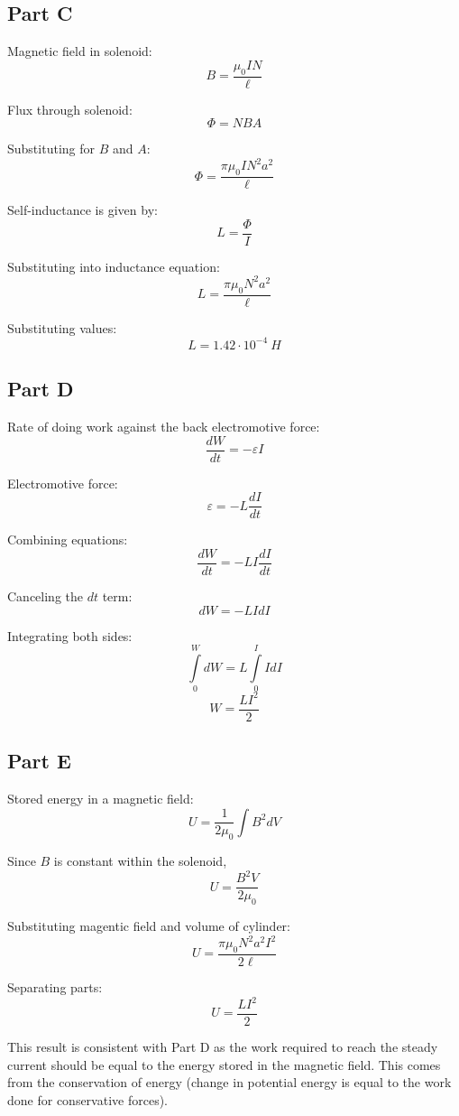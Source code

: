 \documentclass{article}
\begin{document}
\subsection*{Part C}

Magnetic field in solenoid:
$$ B = \frac{ \mu_0 I N}{\ell} $$

Flux through solenoid:
$$ \Phi = N B A $$

Substituting for $B$ and $A$:
$$ \Phi = \frac{ \pi \mu_0 I N^2 a^2}{\ell} $$

Self-inductance is given by:
$$ L = \frac{\Phi}{I} $$

Substituting into inductance equation:
$$ L = \frac{ \pi \mu_0 N^2 a^2}{\ell} $$

Substituting values:
$$ L = 1.42 \cdot 10^{-4}\ \si{H} $$

\subsection*{Part D}

Rate of doing work against the back electromotive force:
$$ \frac{dW}{dt} = - \varepsilon I $$

Electromotive force:
$$ \varepsilon = -L \frac{dI}{dt} $$

Combining equations:
$$ \frac{dW}{dt} = -L I \frac{dI}{dt} $$

Canceling the $dt$ term:
$$ dW = -L I dI $$

Integrating both sides:
$$ \int\limits_0^W dW = L \int\limits_0^I I dI $$
$$ W = \frac{L I^2}{2} $$

\subsection*{Part E}

Stored energy in a magnetic field:
$$ U = \frac{1}{2 \mu_0} \int B^2 dV $$

Since $B$ is constant within the solenoid,
$$ U = \frac{B^2 V}{2 \mu_0} $$

Substituting magentic field and volume of cylinder:
$$ U = \frac{\pi \mu_0 N^2 a^2 I^2}{2 \ell} $$

Separating parts:
$$ U = \frac{LI^2}{2} $$

This result is consistent with Part D as the work required to reach the steady
current should be equal to the energy stored in the magnetic field. This comes
from the conservation of energy (change in potential energy is equal to the work
done for conservative forces).
\end{document}

